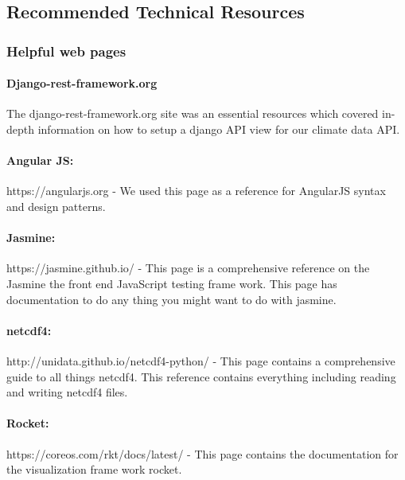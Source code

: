 \documentclass[onecolumn, draftclsnofoot,10pt, compsoc]{article}
\begin{document}
    \subsection{Recommended Technical Resources}
        \subsubsection{Helpful web pages}
            \paragraph{Django-rest-framework.org} The django-rest-framework.org site was an essential resources which covered in-depth information on how to setup a django API view for our climate data API.\\
            
            \paragraph{Angular JS: } https://angularjs.org - We used this page as a reference for AngularJS syntax and design patterns.\\
            
            \paragraph{Jasmine: } https://jasmine.github.io/ - This page is a comprehensive reference on the Jasmine the front end JavaScript testing frame work. This page has documentation to do any thing you might want to do with jasmine.\\ 
            
            \paragraph{netcdf4: } http://unidata.github.io/netcdf4-python/ - This page contains a comprehensive guide to all things netcdf4. This reference contains everything including reading and writing netcdf4 files.\\
            
            \paragraph{Rocket: } https://coreos.com/rkt/docs/latest/ - This page contains the documentation for the visualization frame work rocket.\\
            
\end{document}
